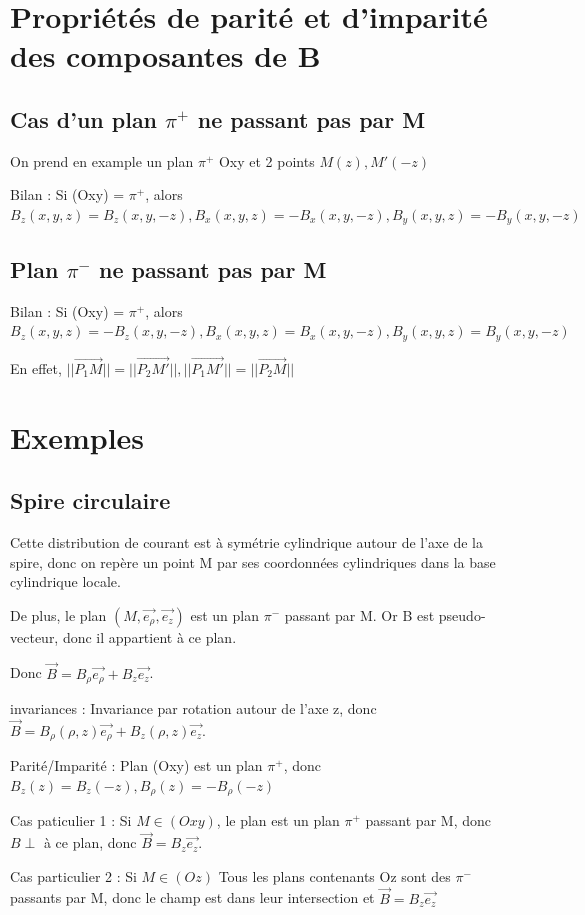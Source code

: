 \documentclass[french]{yLectureNote}
\renewcommand{\vec}{\overrightarrow}
\newcommand{\norm}[1]{||\vec{#1}||}
\newcommand{\er}{\vec{e_{\rho}}}
\newcommand{\pip}{\pi^+}
\newcommand{\pim}{\pi^-}
\begin{document}
\section{Propriétés de parité et d'imparité des composantes de B}
\subsection{Cas d'un plan \(\pip\) ne passant pas par M}
On prend en example un plan \(\pip\) Oxy et 2 points \(M(z), M'(-z)\)

Bilan : Si (Oxy) = \(\pip\), alors \(B_z(x,y,z) = B_z(x,y,-z), B_x(x,y,z) = - B_x(x,y,-z), B_y(x,y,z) = - B_y(x,y,-z)\)
\subsection{Plan \(\pim\) ne passant pas par M}
Bilan : Si (Oxy) = \(\pip\), alors \(B_z(x,y,z) = -B_z(x,y,-z), B_x(x,y,z) =  B_x(x,y,-z), B_y(x,y,z) =  B_y(x,y,-z)\)

En effet, \(\norm{P_1M} = \norm{P_2M'}, \norm{P_1M'} = \norm{P_2M}\)
\section{Exemples}
\subsection{Spire circulaire}
Cette distribution de courant est à symétrie cylindrique autour de l'axe de la spire, donc on repère un point M par ses coordonnées cylindriques dans la base cylindrique locale.

De plus, le plan \((M, \er, \vec{e_z})\) est un plan \(\pim\) passant par M. Or B est pseudo-vecteur, donc il appartient à ce plan.

Donc \(\vec{B} = B_{\rho}\er + B_z \vec{e_z}\).

invariances : Invariance par rotation autour de l'axe z, donc \(\vec{B} = B_{\rho}(\rho, z)\er + B_z(\rho, z) \vec{e_z}\).

Parité/Imparité : Plan (Oxy) est un plan \(\pip\), donc \(B_z(z) = B_z(-z), B_{\rho}(z) = -B_{\rho}(-z)\)

Cas paticulier 1 : Si \(M\in (Oxy)\), le plan est un plan \(\pip\) passant par M, donc \(B\perp\) à ce plan, donc \(\vec{B} = B_z\vec{e_z}\).

Cas particulier 2 : Si \(M\in (Oz)\) Tous les plans contenants Oz sont des \(\pim\) passants par M, donc le champ est dans leur intersection et \(\vec{B} = B_z\vec{e_z}\)
\end{document}
